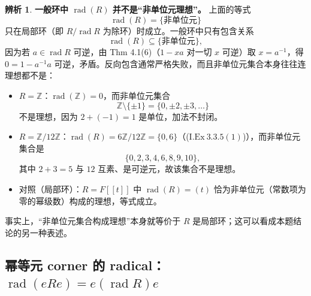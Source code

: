 \documentclass[a4paper]{ctexart}
\theoremstyle{definition}
\theoremstyle{analysis}
\newtheorem{remark}{辨析}[section]
\theoremstyle{plain}
\begin{document}
\begin{remark}
\textbf{一般环中 \(\operatorname{rad}(R)\) 并不是“非单位元理想”。} 上面的等式
\[
  \operatorname{rad}(R)=\{\text{非单位元}\}
\]
只在局部环（即 \(R/\operatorname{rad}R\) 为除环）时成立。一般环中只有包含关系
\[
  \operatorname{rad}(R)\subseteq\{\text{非单位元}\},
\]
因为若 \(a\in\operatorname{rad}R\) 可逆，由 Thm 4.1(6)（\(1-xa\) 对一切 \(x\) 可逆）取 \(x=a^{-1}\)，得 \(0=1-a^{-1}a\) 可逆，矛盾。反向包含通常严格失败，而且非单位元集合本身往往连理想都不是：

\begin{itemize}
  \item \(R=\mathbb Z\)：\(\operatorname{rad}(\mathbb Z)=0\)，而非单位元集合
  \[
    \mathbb Z\setminus\{\pm 1\}=\{0,\pm 2,\pm 3,\dots\}
  \]
  不是理想，因为 \(2+(-1)=1\) 是单位，加法不封闭。
  \item \(R=\mathbb Z/12\mathbb Z\)：\(\operatorname{rad}(R)=6\mathbb Z/12\mathbb Z=\{0,6\}\)（(\(\mathrm{I.Ex}\ 3.3.5(1)\))），而非单位元集合是
  \[
    \{0,2,3,4,6,8,9,10\},
  \]
  其中 \(2+3=5\) 与 \(12\) 互素、是可逆元，故该集合不是理想。
  \item 对照（局部环）：\(R=F[[t]]\) 中 \(\operatorname{rad}(R)=(t)\) 恰为非单位元（常数项为零的幂级数）构成的理想，等式成立。
\end{itemize}

事实上，“非单位元集合构成理想”本身就等价于 \(R\) 是局部环；这可以看成本题结论的另一种表述。
\end{remark}

\subsection{\texorpdfstring{幂等元 corner 的 radical：\(\operatorname{rad}(eRe)=e(\operatorname{rad}R)e\)}{幂等元 corner 的 radical 公式}}\label{subsec:problem-rad-corner-idempotent}
\end{document}
